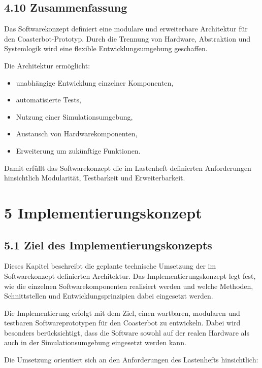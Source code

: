\documentclass[
]{article}
\providecommand{\tightlist}{%
  \setlength{\itemsep}{0pt}\setlength{\parskip}{0pt}}
\begin{document}
\subsection{4.10 Zusammenfassung}\label{zusammenfassung-2}

Das Softwarekonzept definiert eine modulare und erweiterbare Architektur
für den Coasterbot-Prototyp. Durch die Trennung von Hardware,
Abstraktion und Systemlogik wird eine flexible Entwicklungsumgebung
geschaffen.

Die Architektur ermöglicht:

\begin{itemize}
\tightlist
\item
  unabhängige Entwicklung einzelner Komponenten,
\item
  automatisierte Tests,
\item
  Nutzung einer Simulationsumgebung,
\item
  Austausch von Hardwarekomponenten,
\item
  Erweiterung um zukünftige Funktionen.
\end{itemize}

Damit erfüllt das Softwarekonzept die im Lastenheft definierten
Anforderungen hinsichtlich Modularität, Testbarkeit und Erweiterbarkeit.

\section{5 Implementierungskonzept}\label{implementierungskonzept}

\subsection{5.1 Ziel des
Implementierungskonzepts}\label{ziel-des-implementierungskonzepts}

Dieses Kapitel beschreibt die geplante technische Umsetzung der im
Softwarekonzept definierten Architektur. Das Implementierungskonzept
legt fest, wie die einzelnen Softwarekomponenten realisiert werden und
welche Methoden, Schnittstellen und Entwicklungsprinzipien dabei
eingesetzt werden.

Die Implementierung erfolgt mit dem Ziel, einen wartbaren, modularen und
testbaren Softwareprototypen für den Coasterbot zu entwickeln. Dabei
wird besonders berücksichtigt, dass die Software sowohl auf der realen
Hardware als auch in der Simulationsumgebung eingesetzt werden kann.

Die Umsetzung orientiert sich an den Anforderungen des Lastenhefts
hinsichtlich:
\end{document}
